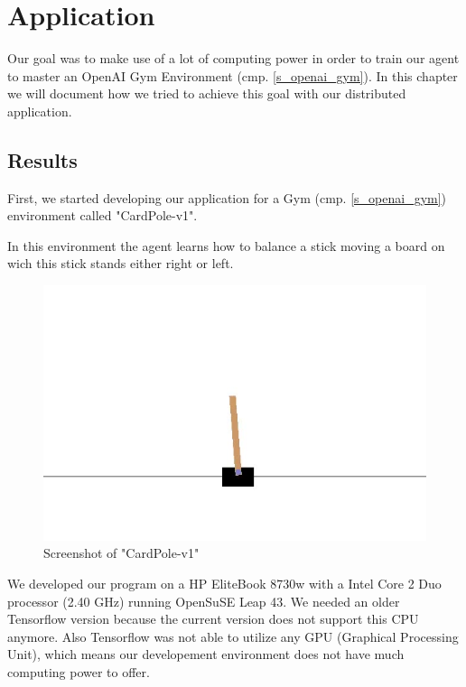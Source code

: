 \section{Application}

Our goal was to make use of a lot of computing power in
order to train our agent to master an OpenAI Gym
Environment (cmp. \ref{s_openai_gym}). In this chapter we
will document how we tried to achieve this goal with our
distributed application.




\newpage



\subsection{Results}

First, we started developing our application for a Gym
(cmp. \ref{s_openai_gym}) environment called "CardPole-v1".

In this environment the agent learns how to balance a stick
moving a board on wich this stick stands either right or
left.

\begin{figure}[H]
  \centering
  \includegraphics[width=\textwidth/2]
  {diagrams/cardpole.jpg}
  \caption{Screenshot of "CardPole-v1"}
\end{figure}

We developed our program on a HP EliteBook 8730w with a
Intel Core 2 Duo processor (2.40 GHz) running OpenSuSE
Leap 43. We needed an older Tensorflow version because the
current version does not support this CPU anymore. Also
Tensorflow was not able to utilize any GPU (Graphical
Processing Unit), which means our developement environment
does not have much computing power to offer.

